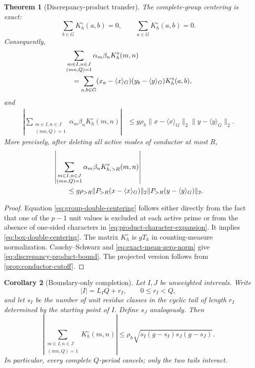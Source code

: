 \documentclass[11pt]{article}
\newtheorem{theorem}{Theorem}[section]
\newtheorem{corollary}[theorem]{Corollary}
\theoremstyle{definition}
\theoremstyle{remark}
\begin{document}
\begin{theorem}[Discrepancy-product transfer]\label{thm:discrepancy-product}
The complete-group centering is exact:
\begin{equation}\label{eq:group-double-centering}
 \sum_{b\in G}K_h^\circ(a,b)=0,
 \qquad
 \sum_{a\in G}K_h^\circ(a,b)=0.
\end{equation}
Consequently,
\begin{align}
 &\sum_{\substack{m\in I,n\in J\\(mn,Q)=1}}
 \alpha_m\beta_nK_h^\circ(m,n)\notag\\
 &\quad=\sum_{a,b\in G}
 (x_a-\langle x\rangle_G)(y_b-\langle y\rangle_G)
 K_h^\circ(a,b),\label{eq:box-double-centering}
\end{align}
and
\begin{align}
 \left|\sum_{\substack{m\in I,n\in J\\(mn,Q)=1}}
 \alpha_m\beta_nK_h^\circ(m,n)\right|
 &\le g\rho_h
 \|x-\langle x\rangle_G\|_2
 \|y-\langle y\rangle_G\|_2.\label{eq:discrepancy-product-bound}
\end{align}
More precisely, after deleting all active modes of conductor at most $R$,
\begin{align}
 &\left|\sum_{\substack{m\in I,n\in J\\(mn,Q)=1}}
 \alpha_m\beta_nK_{h,>R}^\circ(m,n)\right|\notag\\
 &\qquad\le g\rho_{>R}
 \|P_{>R}(x-\langle x\rangle_G)\|_2
 \|P_{>R}(y-\langle y\rangle_G)\|_2.
 \label{eq:projected-discrepancy-product-bound}
\end{align}
\end{theorem}

\begin{proof}
Equation \eqref{eq:group-double-centering} follows either directly from the fact that one of the $p-1$ unit values is excluded at each active prime or from the absence of one-sided characters in \eqref{eq:product-character-expansion}.  It implies \eqref{eq:box-double-centering}.  The matrix $K_h^\circ$ is $gT_h$ in counting-measure normalization.  Cauchy--Schwarz and \eqref{eq:exact-mean-zero-norm} give \eqref{eq:discrepancy-product-bound}.  The projected version follows from \cref{prop:conductor-cutoff}.
\end{proof}

\begin{corollary}[Boundary-only completion]\label{cor:boundary-completion}
Let $I,J$ be unweighted intervals.  Write
\[
 |I|=L_IQ+r_I,
 \qquad 0\le r_I<Q,
\]
and let $s_I$ be the number of unit residue classes in the cyclic tail of length $r_I$ determined by the starting point of $I$.  Define $s_J$ analogously.  Then
\begin{equation}\label{eq:boundary-only-bound}
 \left|\sum_{\substack{m\in I,n\in J\\(mn,Q)=1}}
 K_h^\circ(m,n)\right|
 \le\rho_h
 \sqrt{s_I(g-s_I)s_J(g-s_J)}.
\end{equation}
In particular, every complete $Q$-period cancels; only the two tails interact.
\end{corollary}
\end{document}
